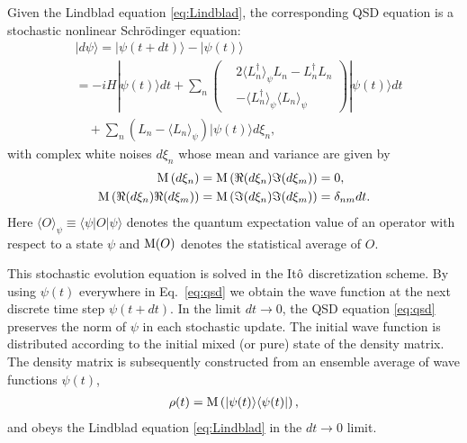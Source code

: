 \documentclass[prd,11pt, amsmath, amsymb, aps, reprint, tightenlines, nofootinbib, longbibliography, abbrv, preprintnumbers]{revtex4-1}
\begin{document}
Given the Lindblad equation \eqref{eq:Lindblad}, the corresponding QSD equation is a stochastic nonlinear Schr\"odinger equation:
\begin{align}
\label{eq:qsd}
&|d\psi\rangle = |\psi(t+dt)\rangle - |\psi(t)\rangle \nonumber \\
&=-i H|\psi(t)\rangle dt
+\sum_n\left(
\begin{aligned}
&2\langle L_n^{\dagger}\rangle_{\psi} L_n - L_n^{\dagger}L_n  \\
&- \langle L_n^{\dagger}\rangle_{\psi}\langle L_n\rangle_{\psi}
\end{aligned}
\right) |\psi(t)\rangle dt \nonumber \\
& \quad +\sum_n \left(L_n - \langle L_n\rangle_{\psi}\right)|\psi(t)\rangle d\xi_n,
\end{align}
with complex white noises $d\xi_n$ whose mean and variance are given by
\begin{subequations}
\begin{align}
{\rm M}\left( d\xi_n\right)&={\rm M}\left( \Re (d\xi_n)\Im (d\xi_m)\right) = 0, \\
{\rm M}\left(\Re (d\xi_n)\Re (d\xi_m)\right)
&={\rm M}\left( \Im (d\xi_n)\Im (d\xi_m)\right) = \delta_{nm} dt.
\end{align}
\end{subequations}
Here $\langle O \rangle_{\psi}\equiv \langle\psi| O |\psi\rangle$ denotes the quantum expectation value of an operator with respect to a state $\psi$ and ${\rm M}(O)$ denotes the statistical average of $O$.

This stochastic evolution equation is solved in the It$\hat{\rm o}$ discretization scheme.
By using $\psi(t)$ everywhere in Eq.~\eqref{eq:qsd} we obtain the wave function at the next discrete time step $\psi(t+dt)$.
In the limit $dt\to 0$, the QSD equation \eqref{eq:qsd} preserves the norm of $\psi$ in each stochastic update.
The initial wave function is distributed according to the initial mixed (or pure) state of the density matrix.
The density matrix is subsequently constructed from an ensemble average of wave functions $\psi(t)$,
\begin{align}
\rho(t) = {\rm M}\left(|\psi(t)\rangle\langle\psi(t)|\right),
\end{align}
and obeys the Lindblad equation \eqref{eq:Lindblad} in the $dt\to 0$ limit.
\end{document}
